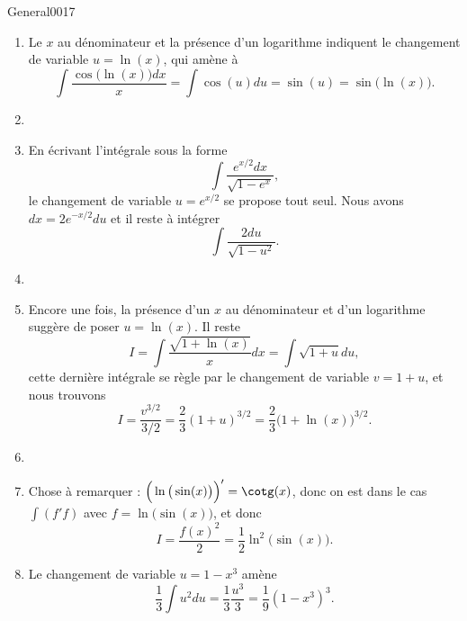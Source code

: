 \begin{corrige}{General0017}
\begin{enumerate}
\item
Le $x$ au dénominateur et la présence d'un logarithme indiquent le changement de variable $u=\ln(x)$, qui amène à
\begin{equation}
	\int\frac{ \cos\big( \ln(x) \big)dx }{ x }=\int\cos(u)du=\sin(u)=\sin\big( \ln(x) \big).
\end{equation}

\item
\item
En écrivant l'intégrale sous la forme
\begin{equation}
	\int\frac{  e^{x/2}dx }{ \sqrt{1- e^{x}} },
\end{equation}
le changement de variable $u= e^{x/2}$ se propose tout seul. Nous avons $dx=2 e^{-x/2}du$ et il reste à intégrer
\begin{equation}
	\int\frac{ 2du }{ \sqrt{1-u^2} }.
\end{equation}

\item
\item
Encore une fois, la présence d'un $x$ au dénominateur et d'un logarithme suggère de poser $u=\ln(x)$. Il reste
\begin{equation}
	I=\int\frac{ \sqrt{1+\ln(x)} }{ x }dx=\int\sqrt{1+u}du,
\end{equation}
cette dernière intégrale se règle par le changement de variable $v=1+u$, et nous trouvons
\begin{equation}
	I=\frac{ v^{3/2} }{ 3/2 }=\frac{ 2 }{ 3 }(1+u)^{3/2}=\frac{ 2 }{ 3 }\big(1+\ln(x)\big)^{3/2}.
\end{equation}

\item
\item
Chose à remarquer : $\Big( \ln\big( \sin(x) \big) \Big)'=\cotg(x)$, donc on est dans le cas $\int(f'f)$ avec $f=\ln\big( \sin(x) \big)$, et donc
\begin{equation}
	I=\frac{ f(x)^2 }{2}=\frac{ 1 }{2}\ln^2\big( \sin(x) \big).
\end{equation}

\item
Le changement de variable $u=1-x^3$ amène
\begin{equation}
	\frac{1}{ 3 }\int u^2du=\frac{1}{ 3 }\frac{ u^3 }{ 3 }=\frac{1}{ 9 }(1-x^3)^3.
\end{equation}
\end{enumerate}



\end{corrige}

